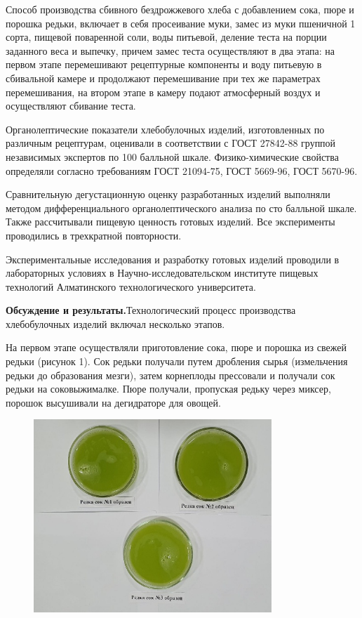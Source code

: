 \begin{multicols}{2}
Способ производства сбивного бездрожжевого хлеба с добавлением сока,
пюре и порошка редьки, включает в себя просеивание муки, замес из муки
пшеничной 1 сорта, пищевой поваренной соли, воды питьевой, деление теста
на порции заданного веса и выпечку, причем замес теста осуществляют в
два этапа: на первом этапе перемешивают рецептурные компоненты и воду
питьевую в сбивальной камере и продолжают перемешивание при тех же
параметрах перемешивания, на втором этапе в камеру подают атмосферный
воздух и осуществляют сбивание теста.

Органолептические показатели хлебобулочных изделий, изготовленных по
различным рецептурам, оценивали в соответствии с ГОСТ 27842-88 группой
независимых экспертов по 100 балльной шкале. Физико-химические свойства
определяли согласно требованиям ГОСТ 21094-75, ГОСТ 5669-96, ГОСТ
5670-96.

Сравнительную дегустационную оценку разработанных изделий выполняли
методом дифференциального органолептического анализа по сто балльной
шкале. Также рассчитывали пищевую ценность готовых изделий. Все
эксперименты проводились в трехкратной повторности.

Экспериментальные исследования и разработку готовых изделий проводили в
лабораторных условиях в Научно-исследовательском институте пищевых
технологий Алматинского технологического университета.

{\bfseries Обсуждение и результаты.}Технологический процесс производства
хлебобулочных изделий включал несколько этапов.

На первом этапе осуществляли приготовление сока, пюре и порошка из
свежей редьки (рисунок 1). Сок редьки получали путем дробления сырья
(измельчения редьки до образования мезги), затем корнеплоды прессовали и
получали сок редьки на соковыжималке. Пюре получали, пропуская редьку
через миксер, порошок высушивали на дегидраторе для овощей.
\end{multicols}


\begin{figure}[H]
	\centering
	\includegraphics[width=0.8\textwidth]{media/pish/image58}
	\caption*{}
\end{figure}


